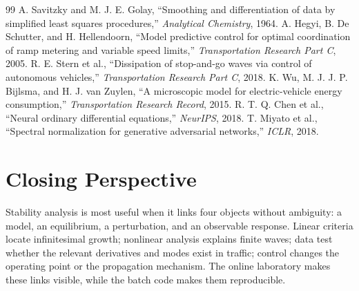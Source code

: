 \documentclass[11pt,a4paper,openany]{book}
\numberwithin{equation}{chapter}
\numberwithin{figure}{chapter}
\numberwithin{table}{chapter}
\begin{document}
\begin{thebibliography}{99}
 A. Savitzky and M. J. E. Golay, ``Smoothing and differentiation of data by simplified least squares procedures,'' \emph{Analytical Chemistry}, 1964.
 A. Hegyi, B. De Schutter, and H. Hellendoorn, ``Model predictive control for optimal coordination of ramp metering and variable speed limits,'' \emph{Transportation Research Part C}, 2005.
 R. E. Stern et al., ``Dissipation of stop-and-go waves via control of autonomous vehicles,'' \emph{Transportation Research Part C}, 2018.
 K. Wu, M. J. J. P. Bijlsma, and H. J. van Zuylen, ``A microscopic model for electric-vehicle energy consumption,'' \emph{Transportation Research Record}, 2015.
 R. T. Q. Chen et al., ``Neural ordinary differential equations,'' \emph{NeurIPS}, 2018.
 T. Miyato et al., ``Spectral normalization for generative adversarial networks,'' \emph{ICLR}, 2018.
\end{thebibliography}

\backmatter
\chapter*{Closing Perspective}
Stability analysis is most useful when it links four objects without ambiguity: a model, an equilibrium, a perturbation, and an observable response. Linear criteria locate infinitesimal growth; nonlinear analysis explains finite waves; data test whether the relevant derivatives and modes exist in traffic; control changes the operating point or the propagation mechanism. The online laboratory makes these links visible, while the batch code makes them reproducible.
\end{document}
